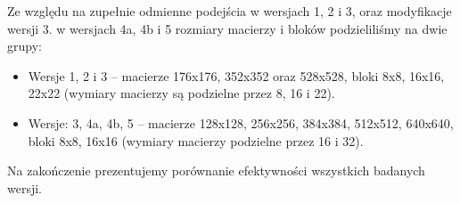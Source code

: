 Ze względu na zupełnie odmienne podejścia w wersjach 1, 2 i 3, oraz modyfikacje wersji 3. w wersjach 4a, 4b i 5 rozmiary macierzy i bloków podzieliliśmy na dwie grupy:
\begin{itemize}
\item Wersje 1, 2 i 3 -- macierze 176x176, 352x352 oraz 528x528, bloki 8x8, 16x16, 22x22 (wymiary macierzy są podzielne przez 8, 16 i 22).
\item Wersje: 3, 4a, 4b, 5  -- macierze 128x128, 256x256, 384x384, 512x512, 640x640, bloki 8x8, 16x16 (wymiary macierzy podzielne przez 16 i 32).
\end{itemize}

Na zakończenie prezentujemy porównanie efektywności wszystkich badanych wersji.
